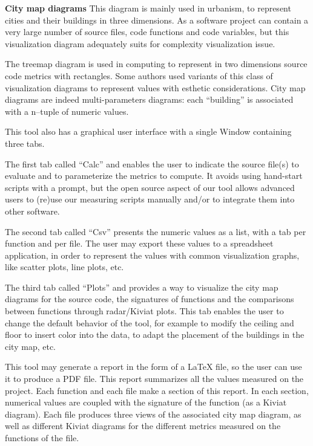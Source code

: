\textbf{City map diagrams}
This  diagram  is mainly  used  in  urbanism,  to  represent  cities  and  their  buildings  in  three  dimensions.  As  a  software  project  can  
contain  a  very  large  number  of  source  files,  code  functions  and  code  variables, but this visualization diagram adequately suits for complexity visualization issue. 

The  treemap  diagram  is  used  in  computing  to represent  in  two  dimensions  source  code  metrics  with  rectangles.  Some  authors  used  variants  of  this  class  of  visualization  diagrams  to  represent  values  with  esthetic  considerations. City  map  diagrams  are  indeed  multi-parameters  diagrams:  each  “building”  is  associated  with  a  n–tuple of numeric values.  

This tool also has a graphical user interface with a single Window containing three tabs.

The first tab called “Calc” and enables the user to indicate the source file(s) to evaluate and to parameterize the metrics to compute. It avoids using hand-start scripts with a prompt, but the open source aspect 
of our tool  allows  advanced  users  to (re)use  our measuring scripts  manually  and/or to  integrate them into other software.

The second tab called “Csv” presents the numeric values as a list, with a tab per function and per file. The  user  may  export  these  values  to  a  spreadsheet  application,  in  order  to  represent  the  values  with  common visualization graphs, like scatter plots, line plots, etc.

The third tab called “Plots” and provides a way to visualize the city map diagrams for the source code, the signatures of functions and the comparisons between functions through radar/Kiviat plots. This tab enables the user to change the default behavior of the tool, for example to modify the ceiling and floor to insert color into the data, to adapt the placement of the buildings in the city map, etc. 

This tool  may  generate  a report  in  the  form  of  a  LaTeX  file,  so  the  user  can  use  it to produce  a  PDF  file.  This  
report summarizes all the values measured on the project. Each function and each file make a section of this report. In  each  section,  numerical  values  are  coupled  with  the  signature  of  the  function  (as  a  Kiviat  diagram).  Each  file  produces  three  views  of  the  associated  city  map  diagram,  as  well  as  different  Kiviat  diagrams  for  the  different metrics measured on the functions of the file. 

